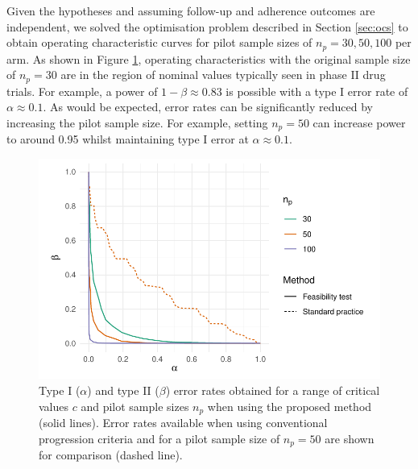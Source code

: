 \documentclass[AMA,STIX1COL]{WileyNJD-v2}
\begin{document}
Given the hypotheses and assuming follow-up and adherence outcomes are independent, we solved the optimisation problem described in Section \ref{sec:ocs} to obtain operating characteristic curves for pilot sample sizes of $n_p = 30, 50, 100$ per arm. As shown in Figure \ref{fig:ex_ocs}, operating characteristics with the original sample size of $n_p = 30$ are in the region of nominal values typically seen in phase II drug trials. For example, a power of $1-\beta \approx 0.83$ is possible with a type I error rate of $\alpha \approx 0.1$. As would be expected, error rates can be significantly reduced by increasing the pilot sample size. For example, setting $n_p = 50$ can increase power to around 0.95 whilst maintaining type I error at $\alpha \approx 0.1$.

\begin{figure}
\centering
\includegraphics[scale=0.8]{./Figures/ex_ocs.pdf}
\caption{Type I ($\alpha$) and type II ($\beta$) error rates obtained for a range of critical values $c$ and pilot sample sizes $n_p$ when using the proposed method (solid lines). Error rates available when using conventional progression criteria and for a pilot sample size of $n_p = 50$ are shown for comparison (dashed line).}
\label{fig:ex_ocs}
\end{figure}
\end{document}
